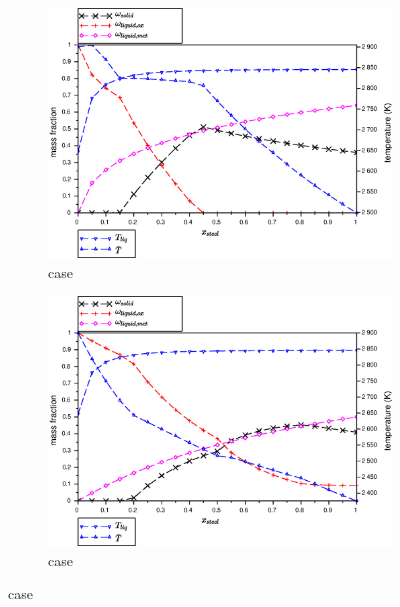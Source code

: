 \begin{figure}[htb!]
\centering
\begin{subfigure}[t]{0.48\textwidth}
 \centering \includegraphics[width=\textwidth]{figures/CalphadBasedEOSTest/OpenCalphad_NUCLEA9_eq/C32_1850_x-T.eps} 
\caption{ case} \label{fig:x-T_C32_1850_OpenCalphad_NUCLEA9_eq} 
\end{subfigure}
\hspace{0.01\textwidth}%
\begin{subfigure}[t]{0.48\textwidth}
 \centering \includegraphics[width=\textwidth]{figures/CalphadBasedEOSTest/OpenCalphad_NUCLEA9_separatedEqs/C32_1850_x-T.eps} 
\caption{ case} \label{fig:x-T_C32_1850_OpenCalphad_NUCLEA9_separatedEqs} 
\end{subfigure}

\end{figure}
